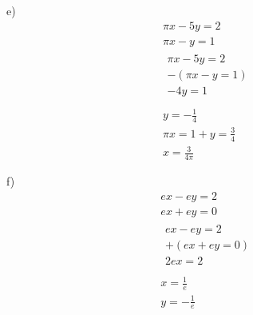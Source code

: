 \documentclass[]{report}
\begin{document}
e) 
\begin{align*}
\pi{}x - 5y = 2\\
\pi{}x - y = 1\\
\begin{split}
\pi{}x - 5y = 2\\
-(\pi{}x - y = 1)\\
\hline
-4y = 1 \\
\end{split}\\
y=-\frac{1}{4}\\
\pi{}x = 1 + y = \frac{3}{4}\\
x = \frac{3}{4\pi}
\end{align*}

f)
\begin{align*}
ex - ey = 2\\
ex + ey = 0\\
\begin{split}
ex - ey = 2\\
+(ex + ey = 0)\\
\hline
2ex = 2 \\
\end{split}\\
x = \frac{1}{e}\\
y = -\frac{1}{e}
\end{align*}
\end{document}
